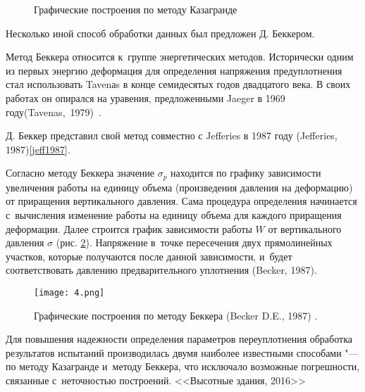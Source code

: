 \begin{figure}[h]
  \centering
  \small

  
  \caption{Графические построения по методу Казагранде}
  \label{eq:caz}
\end{figure}


Несколько иной способ обработки данных был предложен Д. Беккером. 

Метод Беккера относится к~группе энергетических методов.
Исторически одним из первых энергию деформация для определения напряжения предуплотнения стал использовать Tavenаs в конце семидесятых годов двадцатого века. В своих работах он опирался на уравения, предложенными Jaeger в 1969 году(Tavenas,~1979)~\cite{tavenas1979}.

Д. Беккер представил свой метод совместно с Jefferies в 1987 году (Jefferies, 1987)\ref{jeff1987}.

Согласно методу Беккера значение $\sigma_p$ находится по графику зависимости увеличения работы на единицу объема (произведения давления на деформацию) от приращения вертикального давления. 
Сама процедура определения начинается с~вычисления изменение работы на единицу объема для каждого приращения деформации. 
Далее строится график зависимости работы $W$ от вертикального давления $\sigma$ (рис. \ref{eq:beck}). 
Напряжение в~точке пересечения двух прямолинейных участков, 
которые получаются после данной зависимости, 
и~будет соответствовать давлению предварительного уплотнения (Becker, 1987)\cite{becker1987}.

\begin{figure}[ht]
  \centering
  \small
  \label{eq:beck}
  \texttt{[image: 4.png]}
  \caption{Графические построения по методу Беккера (Becker D.E., 1987) \cite{becker1987}.}
\end{figure}


Для повышения надежности определения параметров переуплотнения обработка результатов испытаний производилась двумя наиболее известными способами "--- по методу Казагранде и~методу Беккера, что исключало возможные погрешности, связанные с~неточностью построений. <<Высотные здания, 2016>>
